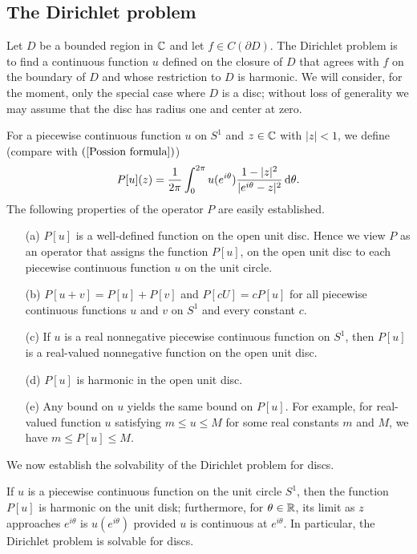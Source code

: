 \subsection{The Dirichlet problem}
Let $D$ be a bounded region in $\mathbb{C}$ and let $f\in C(\partial D)$. The Dirichlet problem is to find a continuous function $u$ defined on the closure of $D$ that agrees with $f$ on the boundary of $D$ and whose restriction to $D$ is harmonic. We will consider, for the moment, only the special case where $D$ is a disc; without loss of generality we may assume that the disc has radius one and center at zero.\par
For a piecewise continuous function $u$ on $S^1$ and $z\in\mathbb{C}$ with $|z|<1$, we define (compare with $(\ref{Possion formula})$)
\[P[u](z)=\frac{1}{2\pi}\int_{0}^{2\pi}u(e^{i\theta})\frac{1-|z|^2}{|e^{i\theta}-z|^2}\mathop{}\!\mathrm{d}\theta.\]
The following properties of the operator $P$ are easily established.
\begin{itemize}
\item[(a)] $P[u]$ is a well-defined function on the open unit disc. Hence we view $P$ as an operator that assigns the function $P[u]$, on the open unit disc to each piecewise continuous function $u$ on the unit circle.
\item[(b)] $P[u+v]=P[u]+P[v]$ and $P[cU]=cP[u]$ for all piecewise continuous functions $u$ and $v$ on $S^1$ and every constant $c$.
\item[(c)] If $u$ is a real nonnegative piecewise continuous function on $S^1$, then $P[u]$ is a real-valued nonnegative function on the open unit disc.
\item[(d)] $P[u]$ is harmonic in the open unit disc.
\item[(e)] Any bound on $u$ yields the same bound on $P[u]$. For example, for real-valued function $u$ satisfying $m\leq u\leq M$ for some real constants $m$ and $M$, we have $m\leq P[u]\leq M$.
\end{itemize}
We now establish the solvability of the Dirichlet problem for discs.
\begin{theorem}
If $u$ is a piecewise continuous function on the unit circle $S^1$, then the function $P[u]$ is harmonic on the unit disk; furthermore, for $\theta\in\mathbb{R}$, its limit as $z$ approaches $e^{i\theta}$ is $u(e^{i\theta})$ provided $u$ is continuous at $e^{i\theta}$. In particular, the Dirichlet problem is solvable for discs.
\end{theorem}
